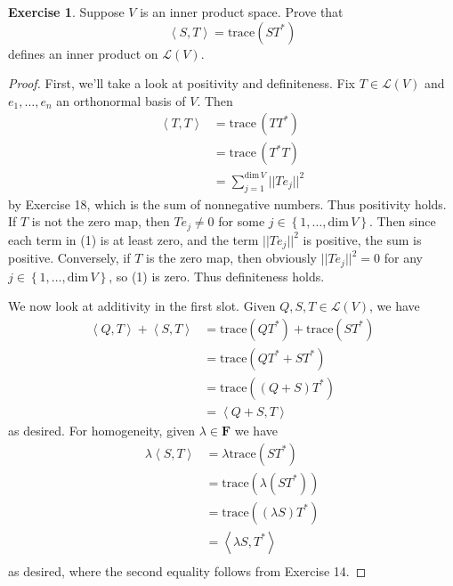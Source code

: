 \documentclass{article}
\theoremstyle{definition}
\newtheorem{ex}{Exercise}
\begin{document}
\begin{ex}
	Suppose $V$ is an inner product space.
	Prove that \begin{equation*}
		\left\langle S, T \right\rangle = \mathrm{trace}(ST^*)
	\end{equation*}
	defines an inner product on $\mathcal{L}(V)$.
\end{ex}
\begin{proof}
	First, we'll take a look at positivity and definiteness.
	Fix $T \in \mathcal{L}(V)$ and $e_1, \dots, e_n$ an orthonormal basis of $V$.
	Then \begin{align*}
		\left\langle T, T \right\rangle & = \mathrm{trace}\,(TT^*)                            \\
		                                & = \mathrm{trace}\,(T^*T)                            \\
		                                & = \sum _{j = 1}^{\mathrm{dim}\,V}||Te_j||^2 \tag{1}
	\end{align*}
	by Exercise 18, which is the sum of nonnegative numbers.
	Thus positivity holds.
	If $T$ is not the zero map, then $Te_j \neq 0$ for some $j \in \left\lbrace 1, \dots, \mathrm{dim}\,V \right\rbrace$.
	Then since each term in (1) is at least zero, and the term $||Te_j||^2$ is positive, the sum is positive.
	Conversely, if $T$ is the zero map, then obviously $||Te_j||^2 = 0$ for any $j \in \left\lbrace 1, \dots, \mathrm{dim}\,V \right\rbrace$, so (1) is zero.
	Thus definiteness holds.

	We now look at additivity in the first slot.
	Given $Q, S, T \in \mathcal{L}(V)$, we have \begin{align*}
		\left\langle Q, T \right\rangle + \left\langle S, T \right\rangle & = \mathrm{trace}(QT^*) + \mathrm{trace}(ST^*) \\
		                                                                  & = \mathrm{trace}(QT^* + ST^*)                 \\
		                                                                  & = \mathrm{trace}((Q + S)T^*)                  \\
		                                                                  & = \left\langle Q + S, T \right\rangle
	\end{align*}
	as desired.
	For homogeneity, given $\lambda \in \mathbf{F}$ we have \begin{align*}
		\lambda\left\langle S, T \right\rangle & = \lambda \mathrm{trace}(ST^*)              \\
		                                       & = \mathrm{trace}(\lambda (ST^*))            \\
		                                       & = \mathrm{trace}((\lambda S)T^*)            \\
		                                       & = \left\langle \lambda S, T^* \right\rangle \\
	\end{align*}
	as desired, where the second equality follows from Exercise 14.


\end{proof}
\end{document}

